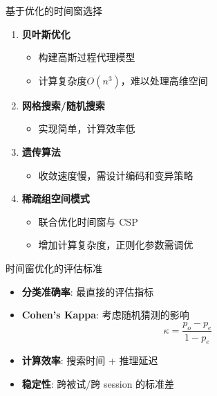 \begin{frame}{基于优化的时间窗选择}
    \begin{enumerate}
        \item \textbf{贝叶斯优化}
        \begin{itemize}
            \item 构建高斯过程代理模型
            \item 计算复杂度$O(n^3)$，难以处理高维空间
        \end{itemize}
        
        \item \textbf{网格搜索/随机搜索}
        \begin{itemize}
            \item 实现简单，计算效率低
        \end{itemize}
        
        \item \textbf{遗传算法}
        \begin{itemize}
            \item 收敛速度慢，需设计编码和变异策略
        \end{itemize}
        
        \item \textbf{稀疏组空间模式}
        \begin{itemize}
            \item 联合优化时间窗与 CSP
            \item 增加计算复杂度，正则化参数需调优
        \end{itemize}
    \end{enumerate}
\end{frame}

\begin{frame}{时间窗优化的评估标准}
    \begin{itemize}
        \item \textbf{分类准确率}: 最直接的评估指标
        \item \textbf{Cohen's Kappa}: 考虑随机猜测的影响
        \[
        \kappa = \frac{p_o - p_e}{1 - p_e}
        \]
        \item \textbf{计算效率}: 搜索时间 + 推理延迟
        \item \textbf{稳定性}: 跨被试/跨 session 的标准差
    \end{itemize}
\end{frame}

